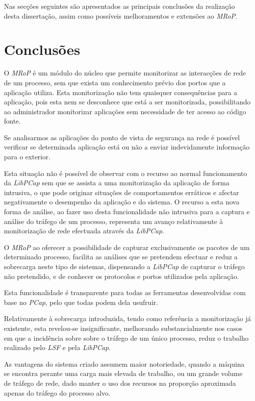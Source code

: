 Nas secções seguintes são apresentados as principais conclusões da realização desta dissertação, assim como possíveis melhoramentos e extensões ao \textit{MRoP}.


\section{Conclusões}
\label{sec:conclusoes}

O \textit{MRoP} é um módulo do núcleo que permite monitorizar as interacções de rede de um processo, sem que exista um conhecimento prévio dos portos que a aplicação utiliza.
Esta monitorização não tem quaisquer consequências para a aplicação, pois esta nem se desconhece que está a ser monitorizada, possibilitando ao administrador monitorizar aplicações sem necessidade de ter acesso ao código fonte.

Se analisarmos as aplicações do ponto de vista de segurança na rede é possível verificar se determinada aplicação está ou não a enviar indevidamente informação para o exterior.

Esta situação não é possível de observar com o recurso ao normal funcionamento da \textit{LibPCap} sem que se assista a uma monitorização da aplicação de forma intrusiva, o que pode originar situações de comportamentos erráticos e afectar negativamente o desempenho da aplicação e do sistema.
O recurso a esta nova forma de análise, ao fazer uso desta funcionalidade não intrusiva para a captura e análise do tráfego de um processo, representa um avanço relativamente à monitorização de rede efectuada através da \textit{LibPCap}.

O \textit{MRoP} ao oferecer a possibilidade de capturar exclusivamente os pacotes de um determinado processo, facilita as análises que se pretendem efectuar e reduz a sobrecarga neste tipo de sistemas, dispensando a \textit{LibPCap} de capturar o tráfego não pretendido, e de conhecer os protocolos e portos utilizados pela aplicação.

Esta funcionalidade é transparente para todas as ferramentas desenvolvidas com base no \textit{PCap}, pelo que todas podem dela usufruir.

Relativamente à sobrecarga introduzida, tendo como referência a monitorização já existente, esta revelou-se insignificante, melhorando substancialmente nos casos em que a incidência sobre sobre o tráfego de um único processo, reduz o trabalho realizado pelo \textit{LSF} e pela \textit{LibPCap}.

As vantagens do sistema criado assumem maior notoriedade, quando a máquina se encontra perante uma carga mais elevada de trabalho, ou um grande volume de tráfego de rede, dado manter o uso dos recursos na proporção aproximada apenas do tráfego do processo alvo.

